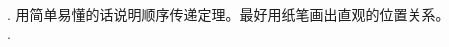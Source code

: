 \documentclass[12pt,UTF8,fontset=none]{ctexbook}
\begin{document}
\begin{appendix}
\begin{sk}
    \mbox{} \\
    . 用简单易懂的话说明顺序传递定理。最好用纸笔画出直观的位置关系。\\
    . 
\end{sk}

\end{appendix}
\end{document}
